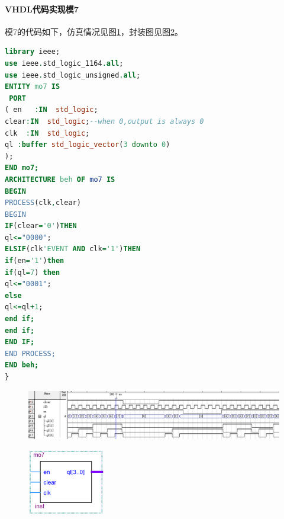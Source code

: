 \documentclass[12pt]{article}
\begin{document}
\paragraph{VHDL代码实现模7}模7的代码如下，仿真情况见图\ref{fig:fangzhenmo7}，封装图见图\ref{fig:fengzhuangmo7}。
\begin{lstlisting}[language=VHDL]
library ieee;
use ieee.std_logic_1164.all;
use ieee.std_logic_unsigned.all;
ENTITY mo7 IS 
 PORT
( en   :IN  std_logic;
clear:IN  std_logic;--when 0,output is always 0
clk  :IN  std_logic;
ql :buffer std_logic_vector(3 downto 0)
);
END mo7;
ARCHITECTURE beh OF mo7 IS
BEGIN
PROCESS(clk,clear)
BEGIN
IF(clear='0')THEN
ql<="0000";
ELSIF(clk'EVENT AND clk='1')THEN
if(en='1')then
if(ql=7) then
ql<="0001";
else
ql<=ql+1;
end if;
end if;
END IF;
END PROCESS;
END beh;
} 
\end{lstlisting} 
\begin{figure}[hp]
	\centering  
	\includegraphics[width=\textwidth]{picture/TIM20181210201132.png} 
	\caption{}
	\label{fig:fangzhenmo7}   
\end{figure}
\begin{figure}[hp]
	\centering  
	\includegraphics[width=0.3\textwidth]{picture/fenzhuangmo7.png} 
	\caption{}
	\label{fig:fengzhuangmo7}   
\end{figure}\par
\end{document}
